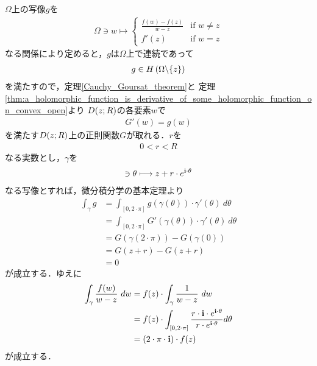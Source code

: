 	\begin{sketch}
		$\Omega$上の写像$g$を
		\begin{align}
			\Omega \ni w \longmapsto
			\begin{cases}
				\displaystyle{\frac{f(w) - f(z)}{w - z}} & \mbox{if } w \neq z \\
				f'(z) & \mbox{if } w = z
			\end{cases}
		\end{align}
		なる関係により定めると，$g$は$\Omega$上で連続であって
		\begin{align}
			g \in H\left(\Omega \backslash \{z\}\right)
		\end{align}
		を満たすので，定理\ref{Cauchy_Goursat_theorem}と
		定理\ref{thm:a_holomorphic_function_is_derivative_of_some_holomorphic_function_on_convex_open}より
		$D(z;R)$の各要素$w$で
		\begin{align}
			G'(w) = g(w)
		\end{align}
		を満たす$D(z;R)$上の正則関数$G$が取れる．$r$を
		\begin{align}
			0 < r < R
		\end{align}
		なる実数とし，$\gamma$を
		\begin{align}
			[0,2 \cdot \pi] \ni \theta \longmapsto z + r \cdot e^{\isym \cdot \theta}
		\end{align}
		なる写像とすれば，微分積分学の基本定理より
		\begin{align}
			\int_{\gamma} g
			&= \int_{[0,2 \cdot \pi]} g(\gamma(\theta)) \cdot \gamma'(\theta)\ d\theta \\
			&= \int_{[0,2 \cdot \pi]} G'(\gamma(\theta)) \cdot \gamma'(\theta)\ d\theta \\
			&= G(\gamma(2 \cdot \pi)) - G(\gamma(0)) \\
			&= G(z + r) - G(z + r) \\
			&= 0
		\end{align}
		が成立する．ゆえに
		\begin{align}
			\int_{\gamma} \frac{f(w)}{w - z}\ dw 
			&= f(z) \cdot \int_{\gamma} \frac{1}{w - z}\ dw \\
			&= f(z) \cdot \int_{[0,2\cdot\pi]} \frac{r \cdot \mathbf{i} \cdot e^{\mathbf{i} \cdot \theta}}{r \cdot e^{\mathbf{i} \cdot \theta}} d\theta \\
			&= (2 \cdot \pi \cdot \mathbf{i}) \cdot f(z)
		\end{align}
		が成立する．
		\QED
	\end{sketch}
	